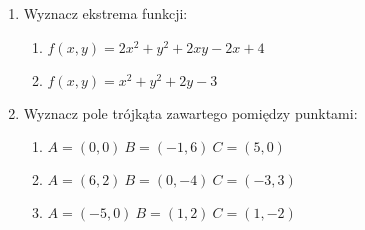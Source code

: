 \documentclass[12pt,a4paper]{article}
\begin{document}
	\begin{enumerate}[1.]
		\item Wyznacz ekstrema funkcji:
		\begin{enumerate}
			\item $f(x,y)=2x^2+y^2+2xy-2x+4$
			\item $f(x,y)=x^2 + y^2 + 2y - 3$
		\end{enumerate}
		\item Wyznacz pole trójkąta zawartego pomiędzy punktami:
		\begin{enumerate}
			\item $A=(0,0) \: B=(-1,6) \: C=(5,0)$
			\item $A=(6,2) \: B=(0,-4) \: C=(-3,3)$
			\item $A=(-5,0) \: B=(1,2) \: C=(1,-2)$
		\end{enumerate} 
	\end{enumerate}
	
\end{document}
